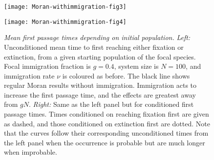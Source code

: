 \begin{figure}[h]
	\centering
	\begin{minipage}{0.45\linewidth}
		\centering
		\texttt{[image: Moran-withimmigration-fig3]}
	\end{minipage}
	\begin{minipage}{0.49\linewidth}
		\centering
		\texttt{[image: Moran-withimmigration-fig4]}
	\end{minipage}
	\caption{\emph{Mean first passage times depending on initial population.}
		\emph{Left:} Unconditioned mean time to first reaching either fixation or extinction, from a given starting population of the focal species. Focal immigration fraction is $g=0.4$, system size is $N=100$, and immigration rate $\nu$ is coloured as before. The black line shows regular Moran results without immigration. Immigration acts to increase the first passage time, and the effects are greatest away from $gN$. 
		\emph{Right:} Same as the left panel but for conditioned first passage times. Times conditioned on reaching fixation first are given as dashed, and those conditioned on extinction first are dotted. Note that the curves follow their corresponding unconditioned times from the left panel when the occurrence is probable but are much longer when improbable. 
	} \label{extntimefig}
\end{figure}

